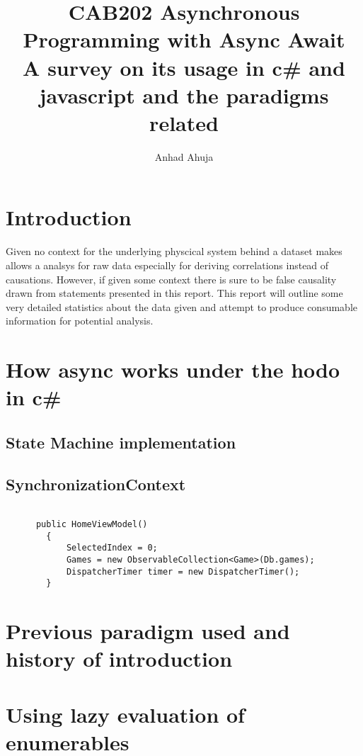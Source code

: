 \documentclass{article}
\title{CAB202 Asynchronous Programming with Async Await
\\\large A survey on its usage in c\# and javascript and the paradigms related}
\author{Anhad Ahuja}
\begin{document}
\maketitle



\section{Introduction}


Given no context for the underlying physcical system behind a dataset makes allows a analsys for raw data especially for deriving correlations instead of causations. However, if given some context there is sure to be false causality drawn from statements presented in this report. This report will outline some very detailed statistics about the data given and attempt to produce consumable information for potential analysis.



\newpage

\section{How async works under the hodo in c\#}
\subsection{State Machine implementation}

\subsection{SynchronizationContext}

\begin{lstlisting}[language={[Sharp]C}]

      public HomeViewModel()
        {
            SelectedIndex = 0;
            Games = new ObservableCollection<Game>(Db.games);
            DispatcherTimer timer = new DispatcherTimer();
        }
\end{lstlisting}

\section{Previous paradigm used and history of introduction}

\section{Using lazy evaluation of enumerables }
\end{document}
